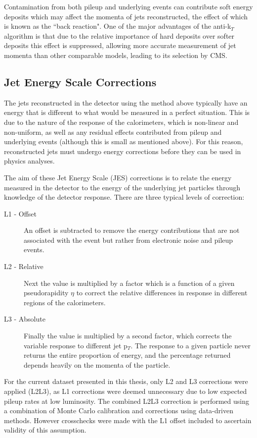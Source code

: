 Contamination from both pileup and underlying events can contribute soft energy deposits which may affect the momenta of jets reconstructed, the effect of which is known as the ``back reaction". One of the major advantages of the anti-k$_{T}$ algorithm is that due to the relative importance of hard deposits over softer deposits this effect is suppressed, allowing more accurate measurement of jet momenta than other comparable models, leading to its selection by CMS.
\subsection{Jet Energy Scale Corrections}
\label{sec:JES}
The jets reconstructed in the detector using the method above typically have an energy that is different to what would be measured in a perfect situation. This is due to the nature of the response of the calorimeters, which is non-linear and non-uniform, as well as any residual effects contributed from pileup and underlying events (although this is small as mentioned above). For this reason, reconstructed jets must undergo energy corrections before they can be used in physics analyses. 

The aim of these Jet Energy Scale (JES) corrections is to relate the energy measured in the detector to the energy of the underlying jet particles through knowledge of the detector response. There are three typical levels of correction:

\begin{description}
\item[L1 - Offset]{An offset is subtracted to remove the energy contributions that are not associated with the event but rather from electronic noise and pileup events.  }
\item[L2 - Relative]{Next the value is multiplied by a factor which is a function of a given pseudorapidity $\eta$ to correct the relative differences in response in different regions of the calorimeters.}
\item [L3 - Absolute]{Finally the value is multiplied by a second factor, which corrects the variable response to different jet p$_{T}$. The response to a given particle never returns the entire proportion of energy, and the percentage returned depends heavily on the momenta of the particle.}
\end{description}

For the current dataset presented in this thesis, only L2 and L3 corrections were applied (L2L3), as L1 corrections were deemed unnecessary due to low expected pileup rates at low luminosity. The combined L2L3 correction is performed using a combination of Monte Carlo calibration and corrections using data-driven methods. However crosschecks were made with the L1 offset included to ascertain validity of this assumption.

